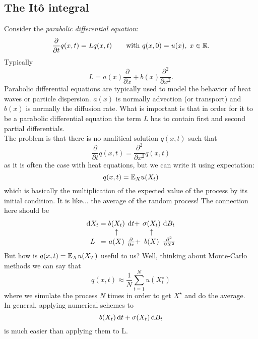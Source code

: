 \documentclass[crop=false, class=article]{standalone}
\begin{document}
\subsection{The It\^o integral}
Consider the \textit{parabolic differential equation}:
\begin{equation*}
	\frac{\partial}{\partial t}q(x,t)=Lq(x,t)\qquad\text{with }q(x,0)=u(x),\;x\in\mathbb{R}.
\end{equation*}
Typically 
\begin{equation*}
	L=a(x)\frac{\partial}{\partial x}+b(x)\frac{\partial^{2}}{\partial x^{2}}.
\end{equation*}
Parabolic differential equations are typically used to model the behavior of heat waves or particle dispersion. $a(x)$ is normally advection (or transport) and $b(x)$ is normally the diffusion rate. What is important is that in order for it to be a parabolic differential equation the term $L$ has to contain first and second partial differentials.\\
The problem is that there is no analitical solution $q(x,t)$ such that
\begin{equation*}
	\frac{\partial}{\partial t}q(x,t)=\frac{\partial^{2}}{\partial x^{2}}q(x,t)
\end{equation*}
as it is often the case with heat equations, but we can write it using expectation:
\begin{equation*}
	q(x,t)=\mathbb{E}_{X}u(X_{t})
\end{equation*}
which is basically the multiplication of the expected value of the process by its initial condition. It is like... the average of the random process! The connection here should be
\begin{equation*}
	\arraycolsep=1.4pt
	\begin{array}{cccccc}
		\dif X_{t}&=&b(X_{t})&\dt+&\sigma(X_{t})&\dif B_{t}\\
		&&\uparrow&&\uparrow&\\
		L&=&a(X)&\frac{\partial}{\partial x}+&b(X)&\frac{\partial^{2}}{\partial X^{2}}
	\end{array}
\end{equation*}
But how is $q(x,t)=\mathbb{E}_{X}u(X_{T})$ useful to us? Well, thinking about Monte-Carlo methods we can say that
\begin{equation*}
	q(x,t)\approx\frac{1}{N}\sum_{t=1}^{N}u(X^{\star}_{t})
\end{equation*}
where we simulate the process $N$ times in order to get $X^{\star}$ and do the average. \\
In general, applying numerical schemes to 
\begin{equation*}
	b(X_{t})\mathop{}\!\mathrm{d} t+\sigma(X_{t})\mathop{}\!\mathrm{d} B_{t}
\end{equation*}
is much easier than applying them to L.
\end{document}
